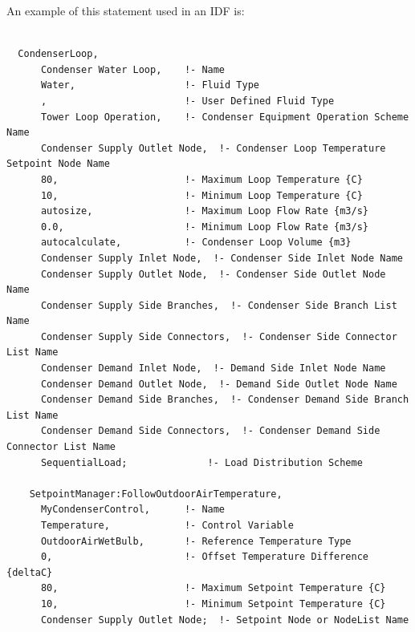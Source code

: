 An example of this statement used in an IDF is:

\begin{lstlisting}

  CondenserLoop,
      Condenser Water Loop,    !- Name
      Water,                   !- Fluid Type
      ,                        !- User Defined Fluid Type
      Tower Loop Operation,    !- Condenser Equipment Operation Scheme Name
      Condenser Supply Outlet Node,  !- Condenser Loop Temperature Setpoint Node Name
      80,                      !- Maximum Loop Temperature {C}
      10,                      !- Minimum Loop Temperature {C}
      autosize,                !- Maximum Loop Flow Rate {m3/s}
      0.0,                     !- Minimum Loop Flow Rate {m3/s}
      autocalculate,           !- Condenser Loop Volume {m3}
      Condenser Supply Inlet Node,  !- Condenser Side Inlet Node Name
      Condenser Supply Outlet Node,  !- Condenser Side Outlet Node Name
      Condenser Supply Side Branches,  !- Condenser Side Branch List Name
      Condenser Supply Side Connectors,  !- Condenser Side Connector List Name
      Condenser Demand Inlet Node,  !- Demand Side Inlet Node Name
      Condenser Demand Outlet Node,  !- Demand Side Outlet Node Name
      Condenser Demand Side Branches,  !- Condenser Demand Side Branch List Name
      Condenser Demand Side Connectors,  !- Condenser Demand Side Connector List Name
      SequentialLoad;              !- Load Distribution Scheme

    SetpointManager:FollowOutdoorAirTemperature,
      MyCondenserControl,      !- Name
      Temperature,             !- Control Variable
      OutdoorAirWetBulb,       !- Reference Temperature Type
      0,                       !- Offset Temperature Difference {deltaC}
      80,                      !- Maximum Setpoint Temperature {C}
      10,                      !- Minimum Setpoint Temperature {C}
      Condenser Supply Outlet Node;  !- Setpoint Node or NodeList Name


\end{lstlisting}
